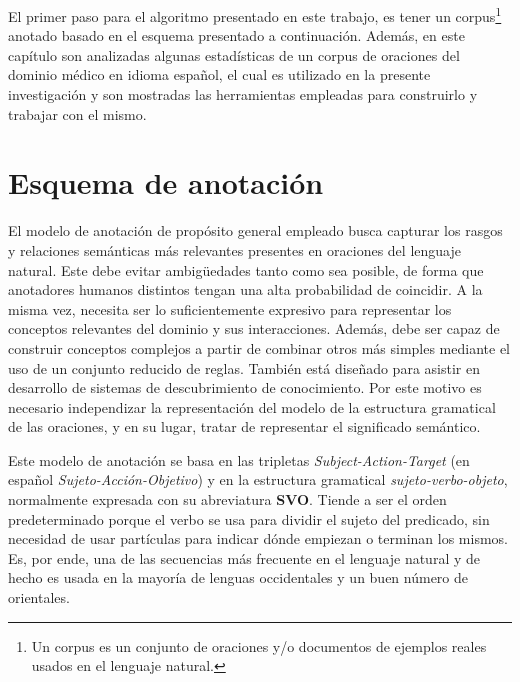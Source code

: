 \label{chapter:annotation_model}
El primer paso para el algoritmo presentado en este trabajo, es tener un corpus\footnote{Un corpus es un conjunto de oraciones y/o documentos de ejemplos reales usados en el lenguaje natural.} anotado basado en el esquema presentado a continuación. Además, en este capítulo son analizadas algunas estadísticas de un corpus de oraciones del dominio médico en idioma español, el cual es utilizado en la presente investigación y son mostradas las herramientas empleadas para construirlo y trabajar con el mismo.

\section{Esquema de anotación}
\label{section:annotation_structure}
El modelo de anotación de propósito general empleado busca capturar los rasgos y relaciones semánticas más relevantes presentes en oraciones del lenguaje natural. Este debe evitar ambigüedades tanto como sea posible, de forma que anotadores humanos distintos tengan una alta probabilidad de coincidir. A la misma vez, necesita ser lo suficientemente expresivo para representar los conceptos relevantes del dominio y sus interacciones. Además, debe ser capaz de construir conceptos complejos a partir de combinar otros más simples mediante el uso de un conjunto reducido de reglas. También está diseñado para asistir en desarrollo de sistemas de descubrimiento de conocimiento. Por este motivo es necesario independizar la representación del modelo de la estructura gramatical de las oraciones, y en su lugar, tratar de representar el significado semántico.

Este modelo de anotación se basa en las tripletas \textit{Subject-Action-Target} (en español \textit{Sujeto-Acción-Objetivo}) y en la estructura gramatical \textit{sujeto-verbo-objeto}, normalmente expresada con su abreviatura \textbf{SVO}. Tiende a ser el orden predeterminado porque el verbo se usa para dividir el sujeto del predicado, sin necesidad de usar partículas para indicar dónde empiezan o terminan los mismos. Es, por ende, una de las secuencias más frecuente en el lenguaje natural y de hecho es usada en la mayoría de lenguas occidentales y un buen número de orientales.

